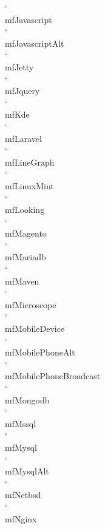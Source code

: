 \documentclass[parskip=half, twocolumn, 13pt]{scrartcl}
\begin{document}
\mfJavascript \quad \char`\\mfJavascript \\
\mfJavascriptAlt \quad \char`\\mfJavascriptAlt \\
\mfJetty \quad \char`\\mfJetty \\
\mfJquery \quad \char`\\mfJquery \\
\mfKde \quad \char`\\mfKde \\
\mfLaravel \quad \char`\\mfLaravel \\
\mfLineGraph \quad \char`\\mfLineGraph \\
\mfLinuxMint \quad \char`\\mfLinuxMint \\
\mfLooking \quad \char`\\mfLooking \\
\mfMagento \quad \char`\\mfMagento \\
\mfMariadb \quad \char`\\mfMariadb \\
\mfMaven \quad \char`\\mfMaven \\
\mfMicroscope \quad \char`\\mfMicroscope \\
\mfMobileDevice \quad \char`\\mfMobileDevice \\
\mfMobilePhoneAlt \quad \char`\\mfMobilePhoneAlt \\
\mfMobilePhoneBroadcast \quad \char`\\mfMobilePhoneBroadcast \\
\mfMongodb \quad \char`\\mfMongodb \\
\mfMssql \quad \char`\\mfMssql \\
\mfMysql \quad \char`\\mfMysql \\
\mfMysqlAlt \quad \char`\\mfMysqlAlt \\
\mfNetbsd \quad \char`\\mfNetbsd \\
\mfNginx \quad \char`\\mfNginx \\
\end{document}
